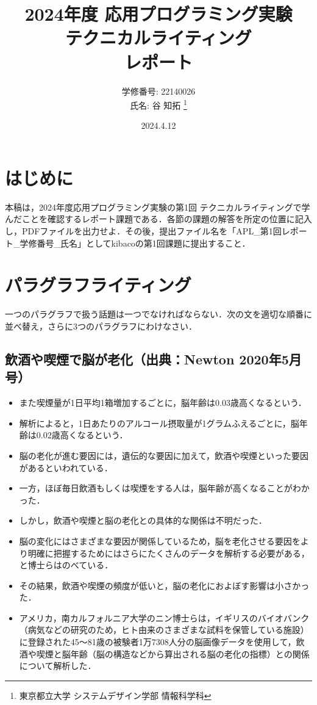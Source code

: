 \documentclass[11pt, a4paper]{jsarticle}
\title{
2024年度 応用プログラミング実験\\
テクニカルライティング\\
レポート}
\author{
学修番号: 22140026 \\
氏名: 谷 知拓 \footnote{東京都立大学 システムデザイン学部 情報科学科} \\
}
\begin{document}
\date{2024.4.12}
\maketitle
\section*{はじめに}
本稿は，2024年度応用プログラミング実験の第1回 テクニカルライティングで学んだことを確認するレポート課題である．各節の課題の解答を所定の位置に記入し，PDFファイルを出力せよ．その後，提出ファイル名を「APL\_第1回レポート\_学修番号\_氏名」としてkibacoの第1回課題に提出すること．

\section{パラグラフライティング}
一つのパラグラフで扱う話題は一つでなければならない．次の文を適切な順番に並べ替え，さらに3つのパラグラフにわけなさい．

\subsection{飲酒や喫煙で脳が老化（出典：Newton 2020年5月号）}
\begin{itemize}
    \item[(1)]また喫煙量が1日平均1箱増加するごとに，脳年齢は0.03歳高くなるという．
    \item[(2)]解析によると，1日あたりのアルコール摂取量が1グラムふえるごとに，脳年齢は0.02歳高くなるという．
    \item[(3)]脳の老化が進む要因には，遺伝的な要因に加えて，飲酒や喫煙といった要因があるといわれている．
    \item[(4)]一方，ほぼ毎日飲酒もしくは喫煙をする人は，脳年齢が高くなることがわかった．
    \item[(5)]しかし，飲酒や喫煙と脳の老化との具体的な関係は不明だった．
    \item[(6)]脳の変化にはさまざまな要因が関係しているため，脳を老化させる要因をより明確に把握するためにはさらにたくさんのデータを解析する必要がある，と博士らはのべている．
    \item[(7)]その結果，飲酒や喫煙の頻度が低いと，脳の老化におよぼす影響は小さかった．
    \item[(8)]アメリカ，南カルフォルニア大学のニン博士らは，イギリスのバイオバンク（病気などの研究のため，ヒト由来のさまざまな試料を保管している施設）に登録された45～81歳の被験者1万7308人分の脳画像データを使用して，飲酒や喫煙と脳年齢（脳の構造などから算出される脳の老化の指標）との関係について解析した．
\end{itemize}
\end{document}
